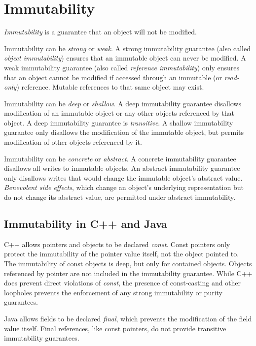 \documentclass[letterpaper,11pt]{article}
\begin{document}
\section{Immutability}

\emph{Immutability} is a guarantee that an object will not be modified.

Immutability can be \emph{strong} or \emph{weak}.
A strong immutability guarantee (also called \emph{object immutability}) ensures that
an immutable object can never be modified.
A weak immutability guarantee (also called \emph{reference immutability}) only
ensures that an object cannot be modified if accessed through an
immutable (or \emph{read-only}) reference.
Mutable references to that same object may exist.

Immutability can be \emph{deep} or \emph{shallow}.
A deep immutability guarantee disallows modification of an immutable object
or any other objects referenced by that object.
A deep immutability guarantee is \emph{transitive}.
A shallow immutability guarantee only disallows the modification of the immutable object,
but permits modification of other objects referenced by it.

Immutability can be \emph{concrete} or \emph{abstract}.
A concrete immutability guarantee disallows all writes to immutable objects.
An abstract immutability guarantee only disallows writes that would change
the immutable object's abstract value.
\emph{Benevolent side effects}, which change an object's underlying representation
but do not change its abstract value, are permitted under abstract immutability.

\subsection{Immutability in C++ and Java}

C++ allows pointers and objects to be declared \emph{const}.
Const pointers only protect the immutability of the pointer value itself, not the object pointed to.
The immutability of const objects is deep, but only for contained objects.
Objects referenced by pointer are not included in the immutability guarantee.
While C++ does prevent direct violations of \emph{const},
the presence of const-casting and other loopholes prevents the enforcement of
any strong immutability or purity guarantees.

Java allows fields to be declared \emph{final},
which prevents the modification of the field value itself.
Final references, like const pointers, do not provide transitive immutability guarantees.
\end{document}
